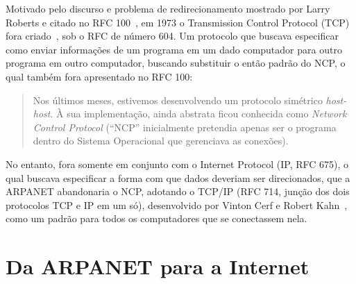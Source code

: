 \documentclass[conference]{IEEEtran}
\begin{document}

  Motivado pelo discurso e problema de redirecionamento mostrado por Larry
  Roberts e citado no RFC 100~\cite{rfc100}, em 1973 o Transmission Control
  Protocol (TCP) fora criado~\cite{framingyears}, sob o RFC de número 604. Um
  protocolo que buscava especificar como enviar informações de um programa em um
  dado computador para outro programa em outro computador, buscando substituir o
  então padrão do NCP, o qual também fora apresentado no RFC 100:

  \begin{quote}

    Nos últimos meses, estivemos desenvolvendo um protocolo simétrico
    \emph{host-host}. À sua implementação, ainda abstrata ficou conhecida como 
    \emph{Network Control Protocol} (``NCP'' inicialmente pretendia apenas ser o
    programa dentro do Sistema Operacional que gerenciava as conexões).
    ~\cite{rfc100}
    
  \end{quote}
  
  No entanto, fora somente em conjunto com o Internet Protocol (IP, RFC 675), o
  qual buscava especificar a forma com que dados deveriam ser direcionados, que a
  ARPANET abandonaria o NCP, adotando o TCP/IP (RFC 714, junção dos dois
  protocolos TCP e IP em um só), desenvolvido por
  Vinton Cerf e Robert Kahn~\cite{fromarpanet}, como um padrão para todos os
  computadores que se conectassem nela.

	
\section{Da ARPANET para a Internet}
\end{document}
